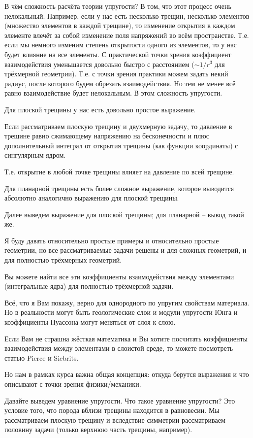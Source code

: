 \documentclass[main.tex]{subfiles}
\begin{document}
В чём сложность расчёта теории упругости? В том, что этот процесс очень нелокальный.
Например, если у нас есть несколько трещин, несколько элементов (множество элементов в каждой трещине), то изменение открытия в каждом элементе влечёт за собой изменение поля напряжений во всём пространстве.
Т.е. если мы немного изменим степень открытости одного из элементов, то у нас будет влияние на все элементы.
С практической точки зрения коэффициент взаимодействия уменьшается довольно быстро с расстоянием ($\sim 1/r^3$ для трёхмерной геометрии).
Т.е. с точки зрения практики можем задать некий радиус, после которого будем обрезать взаимодействия.
Но тем не менее всё равно взаимодействие будет нелокальным.
В этом сложность упругости.


Для плоской трещины у нас есть довольно простое выражение.

Если рассматриваем плоскую трещину и двухмерную задачу, то давление в трещине равно сжимающему напряжению на бесконечности и плюс дополнительный интеграл от открытия трещины (как функции координаты) с сингулярным ядром.

Т.е. открытие в любой точке трещины влияет на давление по всей трещине.


Для планарной трещины есть более сложное выражение, которое выводится абсолютно аналогично выражению для плоской трещины.

Далее выведем выражение для плоской трещины; для планарной -- вывод такой же.


Я буду давать относительно простые примеры и относительно простые геометрии, но все рассматриваемые задачи решены и для сложных геометрий, и для полностью трёхмерных геометрий.

Вы можете найти все эти коэффициенты взаимодействия между элементами (интегральные ядра) для полностью трёхмерной задачи.

Всё, что я Вам покажу, верно для однородного по упругим свойствам материала.
Но в реальности могут быть геологические слои и модули упругости Юнга и коэффициенты Пуассона могут меняться от слоя к слою.

Если Вам не страшна жёсткая математика и Вы хотите посчитать коэффициенты взаимодействия между элементами в слоистой среде, то можете посмотреть статью Pierce и Siebrits.

Но нам в рамках курса важна общая концепция: откуда берутся выражения и что описывают с точки зрения физики/механики.

Давайте выведем уравнение упругости.
Что такое уравнение упругости?
Это условие того, что порода вблизи трещины находится в равновесии.
Мы рассматриваем плоскую трещину и вследствие симметрии рассматриваем половину задачи (только верхнюю часть трещины, например).
\end{document}
